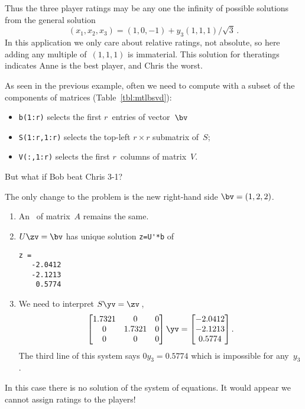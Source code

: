 \begin{example}
\begin{solution}
Thus the three player ratings may be any one the infinity of possible solutions from the general solution
\begin{displaymath}
    (x_1,x_2,x_3) =(1,0,-1)
    +y_3(1,1,1)/\sqrt3\,.
\end{displaymath}
In this application we only care about relative ratings, not absolute, so here adding any multiple of~\((1,1,1)\) is immaterial.
This solution for theratings indicates Anne is the best player, and Chris the worst. 
\end{solution}
\end{example}


\begin{compute}
As seen in the previous example, often we need to compute with a subset of the components of matrices (Table~\ref{tbl:mtlbsvd}):
\begin{itemize}
\item \verb|b(1:r)| selects the first \(r\)~entries of vector~\(\bv\)
\item \verb|S(1:r,1:r)| selects the top-left \(r\times r\) submatrix of~\(S\);
\item \verb|V(:,1:r)| selects the first \(r\)~columns of matrix~\(V\).
\end{itemize}
\end{compute}



\begin{example} \label{eg:rstp2}
But what if Bob beat Chris 3-1?  
\begin{solution} 
The only change to the problem is the new right-hand side \(\bv=(1,2,2)\).
\begin{enumerate}
\item An \svd\ of matrix~\(A\) remains the same.
\item \(U\zv=\bv\) has unique solution \verb|z=U'*b| of
\begin{verbatim}
z =
   -2.0412
   -2.1213
    0.5774
\end{verbatim}
\item We need to interpret \(S\yv=\zv\)\,,
\begin{equation*}
\begin{bmatrix} 1.7321&0&0
\\0&1.7321&0
\\0&0&0 \end{bmatrix}\yv=\begin{bmatrix} 
   -2.0412\\-2.1213\\0.5774
\end{bmatrix}.
\end{equation*}
The third line of this system says \(0y_3=0.5774\) which is impossible for any~\(y_3\).
\end{enumerate}
In this case there is no solution of the system of equations.
It would appear we cannot assign ratings to the players!  
\end{solution}
\end{example}

